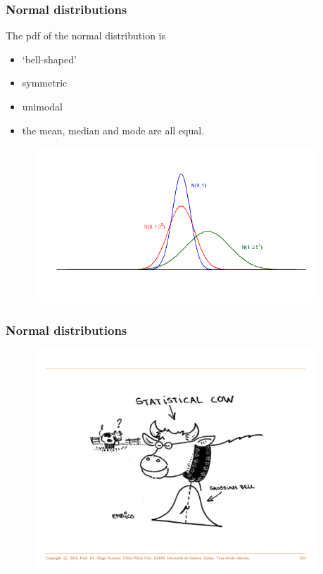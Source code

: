 \documentclass[notes=show,smaller,handout]{beamer}
\newenvironment{stepitemize}{\begin{itemize}[<+->]}{\end{itemize} }
\begin{document}
\begin{frame}%

\frametitle{Normal distributions}

The pdf of the normal distribution is
\begin{stepitemize}
\item `bell-shaped'
\item symmetric
\item unimodal
\item the mean, median and mode are all equal.
\end{stepitemize}
\begin{figure}[ptb]\centering
\includegraphics[width=0.95\textwidth,height=0.75\textheight]{normals4.pdf}%
\end{figure}%
\end{frame}%


\begin{frame}%

\frametitle{Normal distributions}

\begin{figure}[ptb]\centering
\includegraphics[width=0.95\textwidth,height=0.75\textheight]{Cow.pdf}%
\end{figure}%

\end{frame}%
\end{document}
